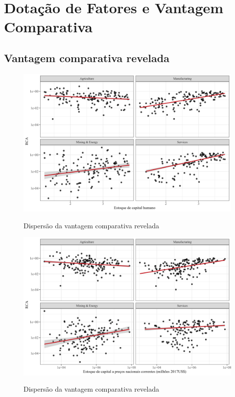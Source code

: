 \clearpage
\section{Dotação de Fatores e Vantagem Comparativa}
\setcounter{subsection}{4}

\subsection{Vantagem comparativa revelada}

\begin{figure}[!h]
    \centering
    \caption{Dispersão da vantagem comparativa revelada}
    \includegraphics*[width = 0.8\linewidth]{../plots/rca_hc.png}
    \label{fig:hc}
\end{figure}


\begin{figure}[!h]
    \centering
    \caption{Dispersão da vantagem comparativa revelada}
    \includegraphics*[width = 0.8\linewidth]{../plots/rca_k_constant.png}
    \label{fig:kc}
\end{figure}

